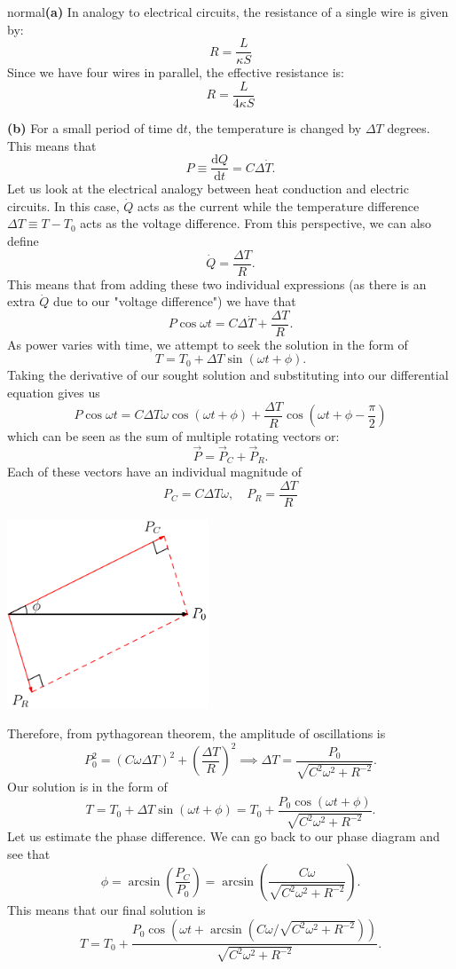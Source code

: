 \begin{solution}{normal}\textbf{(a)} In analogy to electrical circuits, the resistance of a single wire is given by:
$$R = \frac{L}{\kappa S}$$
Since we have four wires in parallel, the effective resistance is:
$$R = \frac{L}{4\kappa S}$$
\vspace{3mm}

\noindent \textbf{(b)} For a small period of time $\text{d}t$, the temperature is changed by $\Delta T$ degrees. This means that 
\[P \equiv \frac{\text{d}Q}{\text{d}t} = C\Delta\dot{T}.\]
Let us look at the electrical analogy between heat conduction and electric circuits. In this case, $\dot{Q}$ acts as the current while the temperature difference $\Delta T \equiv T - T_0$ acts as the voltage difference. From this perspective, we can also define 
\[\dot{Q} = \frac{\Delta T}{R}.\]
This means that from adding these two individual expressions (as there is an extra $\dot{Q}$ due to our "voltage difference") we have that 
\[P\cos \omega t = C\Delta\dot{T} + \frac{\Delta T}{R}.\]
As power varies with time, we attempt to seek the solution in the form of 
\[T = T_0 + \Delta T \sin (\omega t + \phi).\]
Taking the derivative of our sought solution and substituting into our differential equation gives us 
\[P\cos\omega t = C\Delta T\omega \cos (\omega t + \phi) + \frac{\Delta T}{R}\cos \left(\omega t + \phi - \frac{\pi}{2}\right)\]
which can be seen as the sum of multiple rotating vectors or:
\[\vec{P} = \vec{P}_C + \vec{P}_R.\]
Each of these vectors have an individual magnitude of 
\[P_C = C\Delta T \omega, \quad P_R = \frac{\Delta T}{R}\]
\begin{center}
    \includegraphics[width=6cm]{phasor.png}
\end{center}
Therefore, from pythagorean theorem, the amplitude of oscillations is 
\[P_0^2 = (C\omega\Delta T)^2 + \left(\frac{\Delta T}{R}\right)^2\implies \Delta T = \frac{P_0}{\sqrt{C^2\omega^2 + R^{-2}}}.\]
Our solution is in the form of 
\[T = T_0 + \Delta T \sin (\omega t + \phi) = T_0 +  \frac{P_0\cos (\omega t + \phi)}{\sqrt{C^2\omega^2 + R^{-2}}}.\]
Let us estimate the phase difference. We can go back to our phase diagram and see that 
\[\phi = \arcsin\left(\frac{P_C}{P_0}\right) = \arcsin\left(\frac{C\omega}{\sqrt{C^2 \omega^2 + R^{-2}}}\right).\]
This means that our final solution is 
\[T = T_0 +  \frac{P_0\cos \left(\omega t + \arcsin\left(C\omega/\sqrt{C^2 \omega^2 + R^{-2}}\right)\right)}{\sqrt{C^2\omega^2 + R^{-2}}} .\]
\vspace{3mm}


\end{solution}
